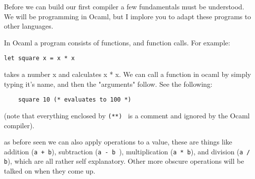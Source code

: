 \documentclass[12pt]{article}
\begin{document}
Before we can build our first compiler a few fundamentals
must be understood. We will be programming in Ocaml, but
I implore you to adapt these programs to other languages.

In Ocaml a program consists of functions, and function calls.
For example:

\begin{verbatim}
let square x = x * x
\end{verbatim}

takes a number x and calculates x * x. We can call a function
in ocaml by simply typing it's name, and then the "arguments"
follow. See the following:

\begin{verbatim}
    square 10 (* evaluates to 100 *)
\end{verbatim}

(note that everything enclosed by {\tt (**) } is a comment
and ignored by the Ocaml compiler).

as before seen we can also apply operations to a value, these
are things like addition ({\tt a + b}), subtraction ({\tt a - b }),
multiplication ({\tt a * b}), and division ({\tt a / b}), which
are all rather self explanatory. Other more obscure operations
will be talked on when they come up.
\end{document}

